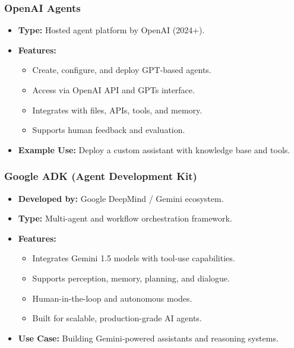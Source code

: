 \begin{frame}[fragile]\frametitle{OpenAI Agents}
    \begin{itemize}
        \item \textbf{Type:} Hosted agent platform by OpenAI (2024+).
        \item \textbf{Features:}
              \begin{itemize}
                  \item Create, configure, and deploy GPT-based agents.
                  \item Access via OpenAI API and GPTs interface.
                  \item Integrates with files, APIs, tools, and memory.
                  \item Supports human feedback and evaluation.
              \end{itemize}
        \item \textbf{Example Use:} Deploy a custom assistant with knowledge base and tools.
    \end{itemize}
\end{frame}

\begin{frame}[fragile]\frametitle{Google ADK (Agent Development Kit)}
    \begin{itemize}
        \item \textbf{Developed by:} Google DeepMind / Gemini ecosystem.
        \item \textbf{Type:} Multi-agent and workflow orchestration framework.
        \item \textbf{Features:}
              \begin{itemize}
                  \item Integrates Gemini 1.5 models with tool-use capabilities.
                  \item Supports perception, memory, planning, and dialogue.
                  \item Human-in-the-loop and autonomous modes.
                  \item Built for scalable, production-grade AI agents.
              \end{itemize}
        \item \textbf{Use Case:} Building Gemini-powered assistants and reasoning systems.
    \end{itemize}
\end{frame}

